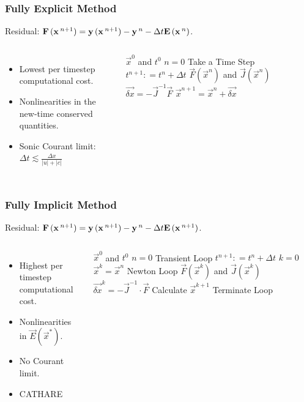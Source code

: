 \documentclass[compress,xcolor=table]{beamer}
\begin{document}
\begin{frame}
\frametitle{Fully Explicit Method}
Residual: $\vec{F}(\vec{x}^{n+1}) = \vec{y}(\vec{x}^{n+1}) - \vec{y}^{n} - \dt{} \vec{E}(\vec{x}^{n})$.
\begin{columns}
\begin{itemize}
\item{Lowest per timestep computational cost.}
\item{Nonlinearities in the new-time conserved quantities.}
\item{Sonic Courant limit: $ \Delta t \lesssim \frac{\Delta x}{|u|+|c|}$}
\end{itemize}

\begin{algorithmic}
\scriptsize
\Require $\vec{x}^{0}$ and $t^{0}$
\Set $n = 0$
\Loop \; Take a Time Step
    \Set $t^{n+1} : = t^{n} + \Delta t$
    \Calculate $\vec{F}(\vec{x}^n)$ and $\vec{J}(\vec{x}^n)$
    \Calculate $\vec{\delta x} = -\vec{J}^{-1}\vec{F}$
    \Calculate $\vec{x}^{n+1} = \vec{x}^{n} + \vec{\delta x}$ 
\end{algorithmic}

\end{columns}

\end{frame}
\begin{frame}
\frametitle{Fully Implicit Method}

Residual: $\vec{F}(\vec{x}^{n+1}) = \vec{y}(\vec{x}^{n+1}) - \vec{y}^{n} - \dt{} \vec{E}(\vec{x}^{n+1})$.

\begin{columns}

\begin{itemize}
\item{Highest per timestep computational cost.}
\item{Nonlinearities in $\vec{E}(\vec{x}^{*})$.}
\item{No Courant limit.}
\item{CATHARE}
\end{itemize}


\begin{algorithmic}
\scriptsize
\Require $\vec{x}^{0}$ and $t^{0}$
\Set $n = 0$
\Loop \; Transient Loop
    \Set $t^{n+1} : = t^{n} + \Delta t$
    \Set $k = 0$
    \Set $\vec{x}^{k} = \vec{x}^{n}$
    \Loop \; Newton Loop
		\Calculate $\vec{F}(\vec{x}^{k})$ and $\vec{J}(\vec{x}^{k})$
		\Calculate $\vec{\delta x}^k = - \vec{J}^{-1}\cdot\vec{F}$
		\BlackBox Calculate $\vec{x}^{k+1}$
		\BlackBox Terminate Loop
\end{algorithmic}

\end{columns}
\end{frame}
\end{document}
